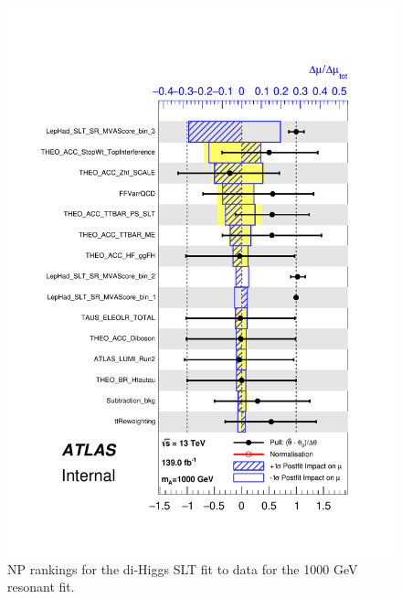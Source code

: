    \begin{figure}
   \centering
   \includegraphics[width=.8\textwidth]{figures/results/HH/LepHad/pulls_SigXsecOverSM_1000_SLT.pdf}
   \caption{NP rankings for the di-Higgs \lephad SLT fit to data for the 1000 GeV resonant fit.}
   \label{fig:LepHadPostfitNPRankings2HDM1000SLT}
   \end{figure}
   
